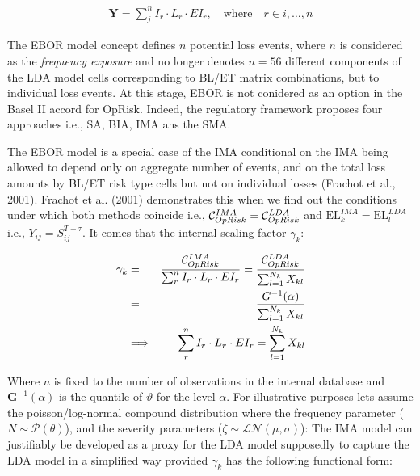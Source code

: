 \documentclass{DissertateUSU}
\begin{document}
\singlespacing

\begin{eqnarray}\label{EBORmodel}
\mathbf{Y} =\sum_j^n I_r\cdot L_r\cdot EI_r, \quad \mbox{where}\quad r \in {i,\ldots,n}
\end{eqnarray} \doublespacing

The EBOR model concept defines \(n\) potential loss events, where \(n\)
is considered as the \emph{frequency exposure} and no longer denotes
\(n=56\) different components of the LDA model cells corresponding to
BL/ET matrix combinations, but to individual loss events. At this stage,
EBOR is not conidered as an option in the Basel II accord for OpRisk.
Indeed, the regulatory framework proposes four approaches i.e., SA, BIA,
IMA ans the SMA.\medskip

The EBOR model is a special case of the IMA conditional on the IMA being
allowed to depend only on aggregate number of events, and on the total
loss amounts by BL/ET risk type cells but not on individual losses
(Frachot et al., 2001). Frachot et al. (2001) demonstrates this when we
find out the conditions under which both methods coincide i.e.,
\(\mathcal{\Large{C}}_{OpRisk}^{IMA} = \mathcal{\Large{C}}_{OpRisk}^{LDA}\)
and \(\mbox{EL}_{k}^{IMA}=\mbox{EL}_l^{LDA}\) i.e.,
\(Y_{ij} = S_{ij}^{T+\tau}\). It comes that the internal scaling factor
\(\gamma_k\):\medskip

\singlespacing

\begin{eqnarray}
\gamma_k &=& \frac{\mathcal{\Large{C}}_{OpRisk}^{IMA}}{\sum_r^n I_r\cdot L_r\cdot EI_r} = \frac{\mathcal{\Large{C}}_{OpRisk}^{LDA}}{\sum_{l=1}^{N_{k}}X_{kl}}\nonumber\\
&=& \frac{G^{-1}(\alpha)}{\sum_{l=1}^{N_{k}}X_{kl}}\\
&\Longrightarrow& \sum_r^n I_r\cdot L_r\cdot EI_r = \sum_{l=1}^{N_{k}}X_{kl}\nonumber\\
\end{eqnarray} \doublespacing

Where \(n\) is fixed to the number of observations in the internal
database and \(\mathbf{G}^{-1}(\alpha)\) is the quantile of
\(\vartheta\) for the level \(\alpha\). For illustrative purposes lets
assume the poisson/log-normal compound distribution where the frequency
parameter (\(N \sim \mathcal{P}(\theta)\)), and the severity parameters
(\(\zeta \sim \mathcal{LN}(\mu,\sigma)\)): The IMA model can justifiably
be developed as a proxy for the LDA model supposedly to capture the LDA
model in a simplified way provided \(\gamma_k\) has the following
functional form:
\end{document}
